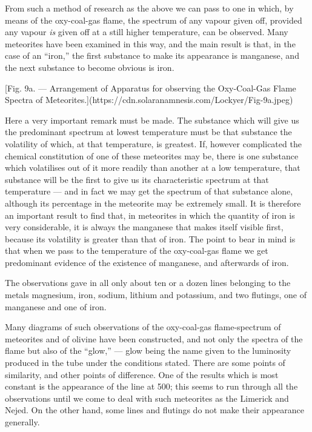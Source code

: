 \documentclass[a4paper, 12pt, oneside, polutonikogreek, english]{article}
\begin{document}
From such a method of research as the above we can pass to one in which, by means of the oxy-coal-gas flame, the spectrum of any vapour given off, provided any vapour \emph{is} given off at a still higher temperature, can be observed. Many meteorites have been examined in this way, and the main result is that, in the case of an ``iron,'' the first substance to make its appearance is manganese, and the next substance to become obvious is iron.

[Fig. 9a. --- Arrangement of Apparatus for observing the Oxy-Coal-Gas Flame Spectra of Meteorites.](https://cdn.solaranamnesis.com/Lockyer/Fig-9a.jpeg)

Here a very important remark must be made. The substance which will give us the predominant spectrum at lowest temperature must be that substance the volatility of which, at that temperature, is greatest. If, however complicated the chemical constitution of one of these meteorites may be, there is one substance which volatilises out of it more readily than another at a low temperature, that substance will be the first to give us its characteristic spectrum at that temperature --- and in fact we may get the spectrum of that substance alone, although its percentage in the meteorite may be extremely small. It is therefore an important result to find that, in meteorites in which the quantity of iron is very considerable, it is always the manganese that makes itself visible first, because its volatility is greater than that of iron. The point to bear in mind is that when we pass to the temperature of the oxy-coal-gas flame we get predominant evidence of the existence of manganese, and afterwards of iron.

The observations gave in all only about ten or a dozen lines belonging to the metals magnesium, iron, sodium, lithium and potassium, and two flutings, one of manganese and one of iron.

Many diagrams of such observations of the oxy-coal-gas flame-spectrum of meteorites and of olivine have been constructed, and not only the spectra of the flame but also of the ``glow,'' --- glow being the name given to the luminosity produced in the tube under the conditions stated. There are some points of similarity, and other points of difference. One of the results which is most constant is the appearance of the line at 500; this seems to run through all the observations until we come to deal with such meteorites as the Limerick and Nejed. On the other hand, some lines and flutings do not make their appearance generally.
\end{document}
